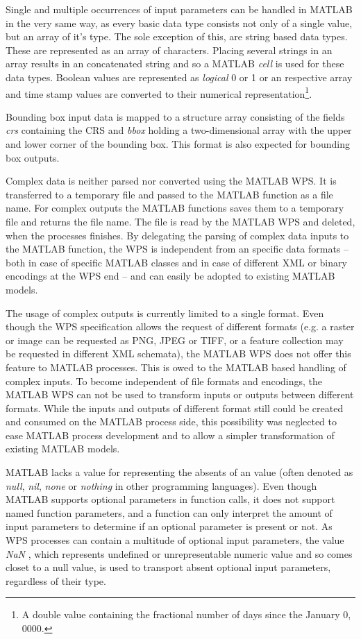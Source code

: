 		Single and multiple occurrences of input parameters can be handled in MATLAB in the very same way, as every basic data type consists not only of a single value, but an array of it's type. The sole exception of this, are string based data types. These are represented as an array of characters. Placing several strings in an array results in an concatenated string and so a MATLAB \emph{cell} is used for these data types. Boolean values are represented as \emph{logical} 0 or 1 or an respective array and time stamp values are converted to their numerical representation\footnote{A double value containing the fractional number of days since the January 0, 0000.}.

		Bounding box input data is mapped to a structure array consisting of the fields \emph{crs} containing the \ac{CRS} and \emph{bbox} holding a two-dimensional array with the upper and lower corner of the bounding box. This format is also expected for bounding box outputs.

		Complex data is neither parsed nor converted using the MATLAB WPS. It is transferred to a temporary file and passed to the MATLAB function as a file name. For complex outputs the MATLAB functions saves them to a temporary file and returns the file name. The file is read by the MATLAB WPS and deleted, when the processes finishes. By delegating the parsing of complex data inputs to the MATLAB function, the WPS is independent from an specific data formats -- both in case of specific MATLAB classes and in case of different XML or binary encodings at the WPS end -- and can easily be adopted to existing MATLAB models.

		The usage of complex outputs is currently limited to a single format. Even though the WPS specification allows the request of different formats (e.g. a raster or image can be requested as PNG, JPEG or TIFF, or a feature collection may be requested in different XML schemata), the MATLAB WPS does not offer this feature to MATLAB processes. This is owed to the MATLAB based handling of complex inputs. To  become independent of file formats and encodings, the MATLAB WPS can not be used to transform inputs or outputs between different formats. While the inputs and outputs of different format still could be created and consumed on the MATLAB process side, this possibility was neglected to ease MATLAB process development and to allow a simpler transformation of existing MATLAB models.

		MATLAB lacks a value for representing the absents of an value (often denoted as \emph{null}, \emph{nil}, \emph{none} or \emph{nothing} in other programming languages). Even though MATLAB supports optional parameters in function calls, it does not support named function parameters, and a function can only interpret the amount of input parameters to determine if an optional parameter is present or not. As WPS processes can contain a multitude of optional input parameters, the value \emph{NaN} \citep{ieee:754:2008}, which represents undefined or unrepresentable numeric value and so comes closet to a null value, is used to transport absent optional input parameters, regardless of their type.

